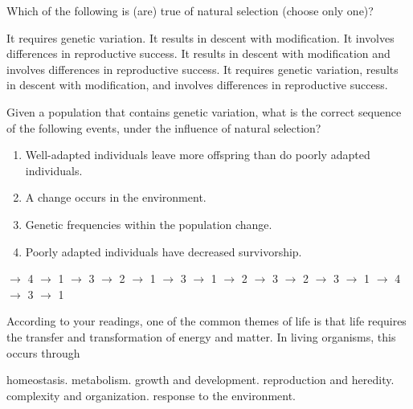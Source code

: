 \question
Which of the following is (are) true of natural selection (choose only one)?

\begin{choices}
\choice It requires genetic variation. %
\choice It results in descent with modification. %
\choice It involves differences in reproductive success. %
\choice It results in descent with modification and involves differences in reproductive success. %
\correctchoice It requires genetic variation, results in descent with modification, and involves differences in reproductive success. %
\end{choices}

\question
Given a population that contains genetic variation, what is the correct sequence of the following events, under the influence of natural selection?
\begin{enumerate}
	\item Well-adapted individuals leave more offspring than do poorly adapted individuals.
	\item A change occurs in the environment.
	\item Genetic frequencies within the population change.
	\item Poorly adapted individuals have decreased survivorship.
\end{enumerate}

\begin{choices}
 $\rightarrow$ 4 $\rightarrow$ 1 $\rightarrow$ 3 %
 $\rightarrow$ 2 $\rightarrow$ 1 $\rightarrow$ 3 %
 $\rightarrow$ 1 $\rightarrow$ 2 $\rightarrow$ 3 %
 $\rightarrow$ 2 $\rightarrow$ 3 $\rightarrow$ 1 %
 $\rightarrow$ 4 $\rightarrow$ 3 $\rightarrow$ 1 %
\end{choices}




\question
According to your readings, one of the common themes of life is that life requires the transfer and transformation of energy and matter.  In living organisms, this occurs through

\begin{choices}
\choice homeostasis. %
\correctchoice metabolism. %
\choice growth and development. %
\choice reproduction and heredity. %
\choice complexity and organization. %
\choice response to the environment. %
\end{choices}

